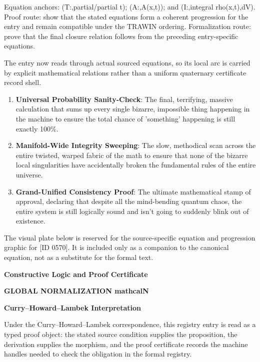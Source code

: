Equation anchors: (T:,partial/partial t); (A:,A(x,t)); and (I:,integral rho(x,t),dV). Proof route: show that the stated equations form a coherent progression for the entry and remain compatible under the TRAWIN ordering. Formalization route: prove that the final closure relation follows from the preceding entry-specific equations.

The entry now reads through actual sourced equations, so its local arc is carried by explicit mathematical relations rather than a uniform quaternary certificate record shell.
\endgroup

\begin{enumerate}[leftmargin=1.6em,itemsep=6pt,topsep=4pt]
\item \textbf{Universal Probability Sanity-Check}: The final, terrifying, massive calculation that sums up every single bizarre, impossible thing happening in the machine to ensure the total chance of 'something' happening is still exactly 100\%.
\item \textbf{Manifold-Wide Integrity Sweeping}: The slow, methodical scan across the entire twisted, warped fabric of the math to ensure that none of the bizarre local singularities have accidentally broken the fundamental rules of the entire universe.
\item \textbf{Grand-Unified Consistency Proof}: The ultimate mathematical stamp of approval, declaring that despite all the mind-bending quantum chaos, the entire system is still logically sound and isn't going to suddenly blink out of existence.
\end{enumerate}

\begingroup\footnotesize\sloppy
The visual plate below is reserved for the source-specific equation and progression graphic for [ID 0570]. It is included only as a companion to the canonical equation, not as a substitute for the formal text.
\par\endgroup
\ifTZPDarkEdition
{}
\fi

\clearpage
\begingroup\tzpsupportsetup
\noindent\textbf{\fontsize{10.8pt}{12.8pt}\selectfont [ID 0570] Constructive Logic and Proof Certificate}\par
\noindent\textbf{\fontsize{10pt}{12pt}\selectfont GLOBAL NORMALIZATION mathcalN}\par
\vspace{0.45em}
\begingroup
\footnotesize
\setlength{\parskip}{0.22em}
\setlength{\parindent}{0pt}
\noindent\textbf{Curry--Howard--Lambek Interpretation}\par
Under the Curry--Howard--Lambek correspondence, this registry entry is read as a typed proof
object: the stated source condition supplies the proposition, the derivation supplies the
morphism, and the proof certificate records the machine handles needed to check the obligation
in the formal registry.


